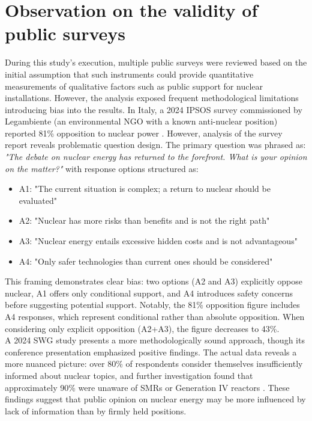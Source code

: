 \section{Observation on the validity of public surveys}
During this study's execution, multiple public surveys were reviewed based on the initial assumption that such instruments could provide quantitative measurements of qualitative factors such as public support for nuclear installations. However, the analysis exposed frequent methodological limitations introducing bias into the results. In Italy, a 2024 IPSOS survey commissioned by Legambiente (an environmental NGO with a known anti-nuclear position) reported 81\% opposition to nuclear power \cite{IPSOS_Nuclear_Survey_2024}. However, analysis of the survey report reveals problematic question design. The primary question was phrased as: \textit{"The debate on nuclear energy has returned to the forefront. What is your opinion on the matter?"} with response options structured as:
\begin{itemize}
    \item A1: "The current situation is complex; a return to nuclear should be evaluated"
    \item A2: "Nuclear has more risks than benefits and is not the right path"
    \item A3: "Nuclear energy entails excessive hidden costs and is not advantageous"
    \item A4: "Only safer technologies than current ones should be considered"
\end{itemize}

This framing demonstrates clear bias: two options (A2 and A3) explicitly oppose nuclear, A1 offers only conditional support, and A4 introduces safety concerns before suggesting potential support. Notably, the 81\% opposition figure includes A4 responses, which represent conditional rather than absolute opposition. When considering only explicit opposition (A2+A3), the figure decreases to 43\%.\\

A 2024 SWG study presents a more methodologically sound approach, though its conference presentation emphasized positive findings. The actual data reveals a more nuanced picture: over 80\% of respondents consider themselves insufficiently informed about nuclear topics, and further investigation found that approximately 90\% were unaware of SMRs or Generation IV reactors \cite{SWG_Nuclear_Survey_2024}. These findings suggest that public opinion on nuclear energy may be more influenced by lack of information than by firmly held positions.